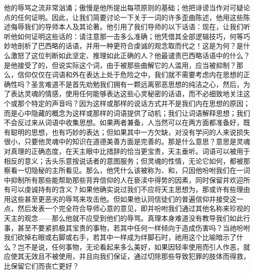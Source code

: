 他的辱骂之流非常汹涌；傲慢是他所提出每项原则的基础；他把诽谤当作对可疑论点的任何证明。因此，让我们简要讨论一下关于一词的许多歪曲陈述，他用这些陈述侮辱我们的导师本人及其论著。他引用了我们导师的以下话语：现在，让我们听听他如何证明这些话的：请注意那一击多么准确；他凭借其全部逻辑技巧，何等巧妙地剖析了巴西略的话语，并用一种更符合虔诚的观念取而代之！这是为何？是什么激怒了这位判断如此坚定、推理如此正确的人？他最谴责巴西略话语中的什么？是他接受了的，但说实际这个词，由于被那些曲解它的人滥用，应当被抑制？那么，信仰仅仅在词语和外在表达上处于危险之中，我们就不需要考虑内在思想的正确性吗？圣言难道不是首先劝勉我们拥有一颗远离邪恶思想的纯洁之心，然后，为了表达灵魂的情感，使用任何能够表达这些心灵秘密的话语，而不必细致地关注这个或那个特定的声音吗？因为这样或那样的说话方式并不是我们内在思想的原因；而是心中隐藏的概念为这样或那样的词语提供了动机；我们让词语解释思想；我们不会反过来从词语中收集思想。如果两者兼备，人当然可以在两方面都准备好，既有聪明的思想，也有巧妙的表达；但如果其中一方欠缺，对没有学问的人来说损失很小，只要他灵魂中的知识在道德美善方面是完善的。那是什么意思？意思是灵魂对真理的正确态度，在天主眼中比措辞的恰当更宝贵，天主垂听。词语可以被用于相反的意义；舌头乐意按说话者的意图服务；但灵魂的性情，无论它如何，都被那察看一切隐秘的主所看见。那么，他凭什么该被称为、和，只因他吩咐我们在一词中抑制所有那些能帮助那些背弃信仰的人在亵渎中得势的因素，同时保留并欢迎所有可以虔诚持有的含义？如果他确实说过我们不应将天主思想为，那或许有些理由用这些甚至更恶劣的辱骂来攻击他。但如果他认同信徒们的普遍信仰并接受这一点，然后发表一个完全符合导师心意的意见，即并吩咐我们通过其他名称来珍视的天主的观念——那么他就不应受到他们的辱骂。真理本身难道没有教导我们如此行事，甚至不要紧抓极其宝贵的事物，若其中任何一样倾向于造成伤害吗？当祂吩咐我们砍掉右眼或右脚或右手，若其中一样成为绊脚石时，祂用这个比喻暗示了什么？岂不是说，任何事物，无论看起来多么美好，如果因轻率使用而引人作恶，就应使其无效且不被使用，并且向我们保证，通过切除那些导致犯罪的肢体而得救，比保留它们而丧亡更好？\par

